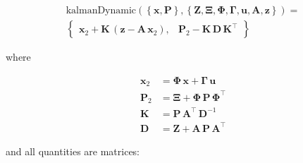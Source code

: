 \documentclass[10pt,oneside,x11names]{article}
\begin{document}
\begin{equation}
\label{eqn:kalman-dynamic-cume-definition}
\begin{matrix}
\textrm{kalmanDynamic}
\left(
\left\{
\mathbold{x},
\mathbold{P}
\right\},
\left\{
\mathbold{Z},
\mathbold{\Xi},
\mathbold{\Phi},
\mathbold{\Gamma},
\mathbold{u},
\mathbold{A},
\mathbold{z}
\right\}
\right) = \\
\begin{Bmatrix}
\mathbold{ x }_{ 2 }+
\mathbold{ K }\,
\left(
\mathbold{ z }-
\mathbold{ A }\,
\mathbold{ x }_{ 2 }
\right), &
\mathbold{ P }_{ 2 }-
\mathbold{ K }\,
\mathbold{ D }\,
\mathbold{ K }^\intercal
\end{Bmatrix}
\end{matrix}
\end{equation}

\noindent where

\begin{align}
\label{eqn:state-propagation-equation}
\mathbold{ x }_{ 2 }
&=
\mathbold{ \Phi  }\,
\mathbold{ x }+
\mathbold{ \Gamma  }\,
\mathbold{ u } \\
\label{eqn:covariance-propagation-equation}
\mathbold{ P }_{ 2 }
&=
\mathbold{ \Xi  }+
\mathbold{ \Phi  }\,
\mathbold{ P }\,
\mathbold{ \Phi  }^{ \intercal  } \\
\label{eqn:kalman-gain-definition}
\mathbold{K}
&=
\mathbold{P}\,
\mathbold{A}^\intercal\,
\mathbold{D}^{-1} \\
\label{eqn:kalman-denominator-definition}
\mathbold{D}
&= \mathbold{Z} +
\mathbold{A}\,
\mathbold{P}\,
\mathbold{A}^\intercal
\end{align}

\noindent and all quantities are matrices:
\end{document}
